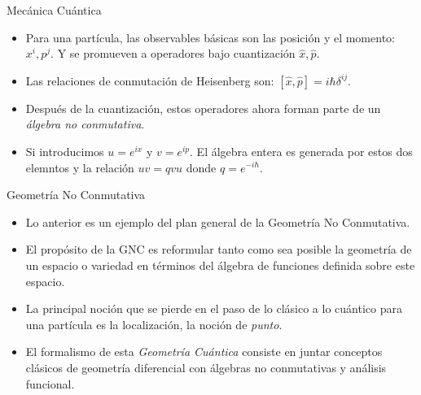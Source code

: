 \documentclass{beamer}
\begin{document}
\begin{frame}{Mecánica Cuántica}

\begin{itemize}

\item Para una partícula, las observables básicas son las posición y el momento: $x^i, p^j$. Y se promueven a operadores bajo cuantización $\hat{x}, \hat{p}$.

\vspace{5mm}
\item Las relaciones de conmutación de Heisenberg son: $[\hat{x}, \hat{p} ] = i \hbar \delta^{ij}$.
\vspace{5mm}
\item Después de la cuantización, estos operadores ahora forman parte de un \textit{álgebra no conmutativa}.
\vspace{5mm}
\item Si introducimos $u = e^{ix}$ y $v = e^{ip}$. El álgebra entera es generada por estos dos elemntos y la relación $uv = qvu$ donde $q = e^{- i \hbar}$.
\end{itemize}
\end{frame}



\begin{frame}{Geometría No Conmutativa}

\begin{itemize}

\item Lo anterior es un ejemplo del plan general de la Geometría No Conmutativa.

\vspace{5mm}
\item El propósito de la GNC es reformular tanto como sea posible la geometría de un espacio o variedad en términos del álgebra de funciones definida sobre este espacio.
\vspace{5mm}
\item La principal noción que se pierde en el paso de lo clásico a lo cuántico para una partícula es la localización, la noción de \textit{punto}.
\vspace{5mm}
\item El formalismo de esta \textit{Geometría Cuántica} consiste en juntar conceptos clásicos de geometría diferencial con álgebras no conmutativas y análisis funcional.
\end{itemize}
\end{frame}
\end{document}
